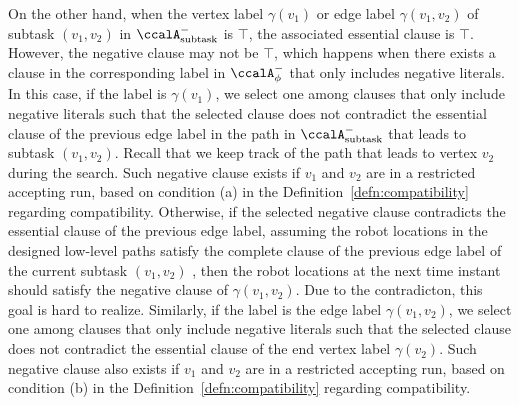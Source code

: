 \documentclass[Afour,sageh,times]{sagej}
\newcommand{\auto}[1]{\ccalA_{\textup{#1}}}
\newcommand{\autop}{\ccalA_{\phi}}
\begin{document}
{{   On the other hand, when the vertex label $\gamma(v_1)$ or edge label $\gamma(v_1, v_2)$ of subtask $(v_1, v_2)$ in $\auto{subtask}^-$ is $\top$, the associated essential clause is $\top$. However, the negative clause may not be $\top$, which happens when there exists a  clause in the corresponding label in $\autop^-$ that only includes negative literals. In this case, if the label is $\gamma(v_1)$, we select one  among clauses that only include negative literals such that the selected clause does not contradict the essential clause of the previous edge label in the path in $\auto{subtask}^-$ that leads to subtask $(v_1, v_2)$. Recall that we keep track of the path that leads to vertex $v_2$ during the search.   Such negative clause exists if $v_1$ and $v_2$ are in a restricted accepting run,  based on condition (a)  in the Definition~\ref{defn:compatibility} regarding compatibility.
   Otherwise, if the selected negative clause contradicts the essential clause of the previous edge label, assuming the robot locations in the designed low-level paths  satisfy the complete clause of the previous edge label of the current subtask $(v_1, v_2)$ , then the robot locations at the next time instant  should satisfy the negative clause of $\gamma(v_1, v_2)$. Due to the contradicton, this goal is hard to realize.  Similarly, if the label is the edge label $\gamma(v_1, v_2)$, we select one among clauses that only include negative literals such that the selected clause does not contradict the essential clause of the end vertex label $\gamma(v_2)$. Such negative clause also exists  if $v_1$ and $v_2$ are in a restricted accepting run,  based on condition (b)  in the Definition~\ref{defn:compatibility} regarding compatibility.}



}
\end{document}
